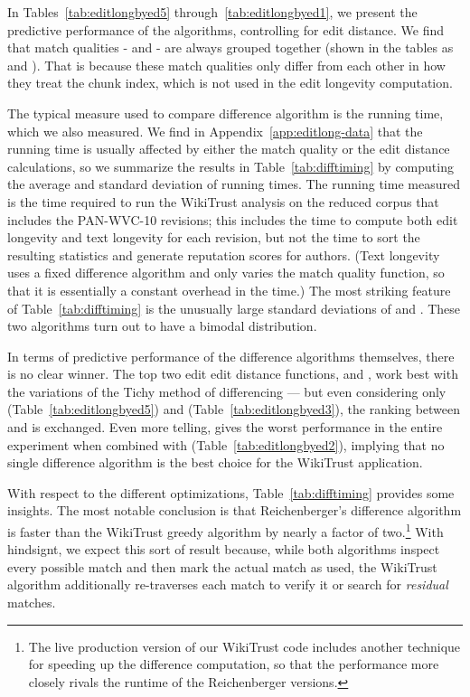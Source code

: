 In Tables~\ref{tab:editlongbyed5} through~\ref{tab:editlongbyed1},
we present the predictive performance of the algorithms,
controlling for edit distance.
We find that match qualities - and - are always grouped
together (shown in the tables as  and ).
That is because these match qualities only differ from each
other in how they treat the chunk index, which is not used in the
edit longevity computation.



The typical measure used to compare difference algorithm is the
running time, which we also measured.
We find in Appendix~\ref{app:editlong-data} that the running time
is usually affected by either the
match quality or the edit distance calculations, so we
summarize the results in Table~\ref{tab:difftiming} by
computing the average and standard deviation of running times.
The running time measured is the time required to run the
WikiTrust analysis on the reduced corpus that includes
the PAN-WVC-10 revisions; this includes the time to compute
both edit longevity and text longevity for each revision,
but not the time to sort the resulting statistics and generate
reputation scores for authors.
(Text longevity uses a fixed difference algorithm and only varies
the match quality function, so that it is essentially a constant
overhead in the time.)
The most striking feature of Table~\ref{tab:difftiming} is the unusually
large standard deviations of  and .
These two algorithms turn out to have a bimodal distribution.

In terms of predictive performance of the difference algorithms
themselves, there is no clear winner.
The top two edit edit distance functions,  and ,
work best with the variations of the Tichy method of differencing ---
but even considering only  (Table~\ref{tab:editlongbyed5})
and  (Table~\ref{tab:editlongbyed3}), the ranking between 
and  is exchanged.
Even more telling,  gives the worst performance in the entire
experiment when combined with  (Table~\ref{tab:editlongbyed2}),
implying that no single difference algorithm is the best choice for
the WikiTrust application.

With respect to the different optimizations, Table~\ref{tab:difftiming}
provides some insights.
The most notable conclusion is that Reichenberger's
difference algorithm is faster than the WikiTrust
greedy algorithm by nearly a factor of two.\footnote{The live
production version of our WikiTrust code includes another technique
for speeding up the difference computation, so that the performance
more closely rivals the runtime of the Reichenberger versions.}
With hindsignt, we expect this sort of result because, while both algorithms
inspect every possible match and then mark the actual
match as used, the WikiTrust algorithm additionally
re-traverses each match to verify it or search for
\textit{residual} matches.

